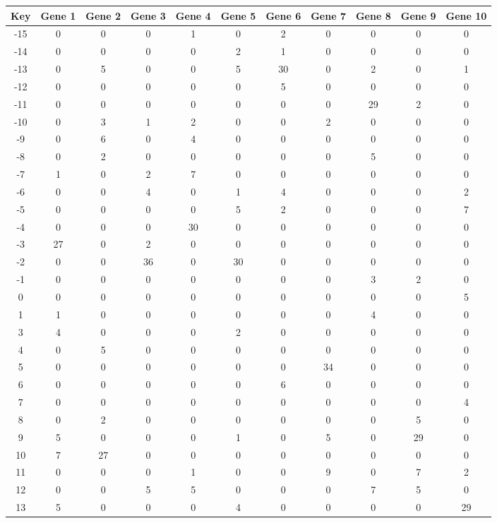 \begin{tabular}{|c|c|c|c|c|c|c|c|c|c|c|}
\hline
Key & Gene 1 & Gene 2 & Gene 3 & Gene 4 & Gene 5 & Gene 6 & Gene 7 & Gene 8 & Gene 9 & Gene 10 \\
\hline
-15 & 0 & 0 & 0 & 1 & 0 & 2 & 0 & 0 & 0 & 0 \\
-14 & 0 & 0 & 0 & 0 & 2 & 1 & 0 & 0 & 0 & 0 \\
-13 & 0 & 5 & 0 & 0 & 5 & 30 & 0 & 2 & 0 & 1 \\
-12 & 0 & 0 & 0 & 0 & 0 & 5 & 0 & 0 & 0 & 0 \\
-11 & 0 & 0 & 0 & 0 & 0 & 0 & 0 & 29 & 2 & 0 \\
-10 & 0 & 3 & 1 & 2 & 0 & 0 & 2 & 0 & 0 & 0 \\
-9 & 0 & 6 & 0 & 4 & 0 & 0 & 0 & 0 & 0 & 0 \\
-8 & 0 & 2 & 0 & 0 & 0 & 0 & 0 & 5 & 0 & 0 \\
-7 & 1 & 0 & 2 & 7 & 0 & 0 & 0 & 0 & 0 & 0 \\
-6 & 0 & 0 & 4 & 0 & 1 & 4 & 0 & 0 & 0 & 2 \\
-5 & 0 & 0 & 0 & 0 & 5 & 2 & 0 & 0 & 0 & 7 \\
-4 & 0 & 0 & 0 & 30 & 0 & 0 & 0 & 0 & 0 & 0 \\
-3 & 27 & 0 & 2 & 0 & 0 & 0 & 0 & 0 & 0 & 0 \\
-2 & 0 & 0 & 36 & 0 & 30 & 0 & 0 & 0 & 0 & 0 \\
-1 & 0 & 0 & 0 & 0 & 0 & 0 & 0 & 3 & 2 & 0 \\
0 & 0 & 0 & 0 & 0 & 0 & 0 & 0 & 0 & 0 & 5 \\
1 & 1 & 0 & 0 & 0 & 0 & 0 & 0 & 4 & 0 & 0 \\
3 & 4 & 0 & 0 & 0 & 2 & 0 & 0 & 0 & 0 & 0 \\
4 & 0 & 5 & 0 & 0 & 0 & 0 & 0 & 0 & 0 & 0 \\
5 & 0 & 0 & 0 & 0 & 0 & 0 & 34 & 0 & 0 & 0 \\
6 & 0 & 0 & 0 & 0 & 0 & 6 & 0 & 0 & 0 & 0 \\
7 & 0 & 0 & 0 & 0 & 0 & 0 & 0 & 0 & 0 & 4 \\
8 & 0 & 2 & 0 & 0 & 0 & 0 & 0 & 0 & 5 & 0 \\
9 & 5 & 0 & 0 & 0 & 1 & 0 & 5 & 0 & 29 & 0 \\
10 & 7 & 27 & 0 & 0 & 0 & 0 & 0 & 0 & 0 & 0 \\
11 & 0 & 0 & 0 & 1 & 0 & 0 & 9 & 0 & 7 & 2 \\
12 & 0 & 0 & 5 & 5 & 0 & 0 & 0 & 7 & 5 & 0 \\
13 & 5 & 0 & 0 & 0 & 4 & 0 & 0 & 0 & 0 & 29 \\
\hline
\end{tabular}